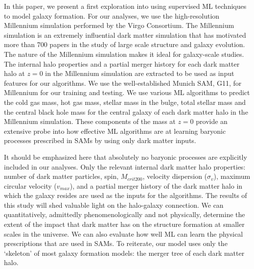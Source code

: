 \documentclass[a4paper,fleqn,usenatbib]{mnras}
\begin{document}
\par 
In this paper, we present a first exploration into using supervised ML techniques to model galaxy formation. For our analyses, we use the high-resolution Millennium simulation \citep{springel2005cosmological, springel2005simulations} performed by the Virgo Consortium. The Millennium simulation is an extremely influential dark matter simulation that has motivated more than 700 papers in the study of large scale structure and galaxy evolution. The nature of the Millennium simulation makes it ideal for galaxy-scale studies. The internal halo properties and a partial merger history for each dark matter halo at $z=0$ in the Millennium simulation are extracted to be used as input features for our algorithms. We use the well-established Munich SAM, G11, for Millennium \citep{croton2006many, de2006formation, de2007hierarchical, guo2011dwarf} for our training and testing. We use various ML algorithms to predict the cold gas mass, hot gas mass, stellar mass in the bulge, total stellar mass and the central black hole mass for the central galaxy of each dark matter halo in the Millennium simulation. These components of the mass at $z=0$ provide an extensive probe into how effective ML algorithms are at learning baryonic processes prescribed in SAMs by using only dark matter inputs. 

\par
It should be emphasized here that absolutely no baryonic processes are explicitly included in our analyses. Only the relevant internal dark matter halo properties: number of dark matter particles, spin, $M_{crit200}$, velocity dispersion ($\sigma_v$), maximum circular velocity ($v_{max}$), and a partial merger history of the dark matter halo in which the galaxy resides are used as the inputs for the algorithms. The results of this study will shed valuable light on the halo-galaxy connection. We can quantitatively, admittedly phenomenologically and not physically, determine the extent of the impact that dark matter has on the structure formation at smaller scales in the universe. We can also evaluate how well ML can learn the physical prescriptions that are used in SAMs. To reiterate, our model uses only the `skeleton' of most galaxy formation models: the merger tree of each dark matter halo. 
\end{document}
